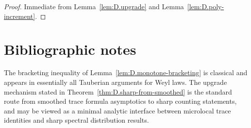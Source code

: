 \begin{proof}
Immediate from Lemma~\ref{lem:D.upgrade} and Lemma~\ref{lem:D.poly-increment}.
\end{proof}

\section*{Bibliographic notes}

The bracketing inequality of Lemma~\ref{lem:D.monotone-bracketing} is classical and appears in essentially all
Tauberian arguments for Weyl laws.
The upgrade mechanism stated in Theorem~\ref{thm:D.sharp-from-smoothed} is the standard route from smoothed trace
formula asymptotics to sharp counting statements, and may be viewed as a minimal analytic interface between
microlocal trace identities and sharp spectral distribution results.

